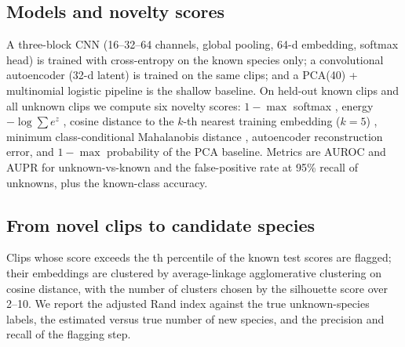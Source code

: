 \subsection{Models and novelty scores}
A three-block CNN (16--32--64 channels, global pooling, 64-d embedding,
softmax head) is trained with cross-entropy on the known species only; a
convolutional autoencoder (32-d latent) is trained on the same clips; and a
PCA(40) + multinomial logistic pipeline is the shallow baseline. On held-out
known clips and all unknown clips we compute six novelty scores: $1-\max$
softmax \cite{hendrycks2017baseline}, energy $-\log\sum e^{z}$
\cite{liu2020energy}, cosine distance to the $k$-th nearest training embedding
($k=5$) \cite{sun2022knn}, minimum class-conditional Mahalanobis distance
\cite{lee2018simple}, autoencoder reconstruction error, and $1-\max$ probability
of the PCA baseline. Metrics are AUROC and AUPR for unknown-vs-known and the
false-positive rate at 95\% recall of unknowns, plus the known-class accuracy.

\subsection{From novel clips to candidate species}
Clips whose score exceeds the \CluFlagQ th percentile of the known test scores
are flagged; their embeddings are clustered by average-linkage agglomerative
clustering on cosine distance, with the number of clusters chosen by the
silhouette score over 2--10. We report the adjusted Rand index against the true
unknown-species labels, the estimated versus true number of new species, and
the precision and recall of the flagging step.
